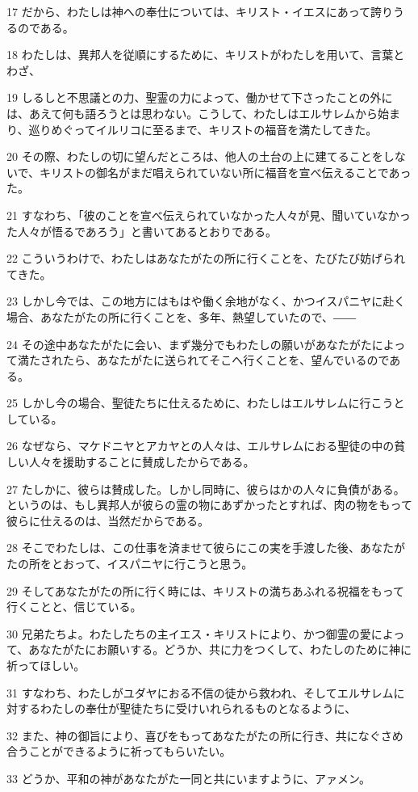 \par 17 だから、わたしは神への奉仕については、キリスト・イエスにあって誇りうるのである。
\par 18 わたしは、異邦人を従順にするために、キリストがわたしを用いて、言葉とわざ、
\par 19 しるしと不思議との力、聖霊の力によって、働かせて下さったことの外には、あえて何も語ろうとは思わない。こうして、わたしはエルサレムから始まり、巡りめぐってイルリコに至るまで、キリストの福音を満たしてきた。
\par 20 その際、わたしの切に望んだところは、他人の土台の上に建てることをしないで、キリストの御名がまだ唱えられていない所に福音を宣べ伝えることであった。
\par 21 すなわち、「彼のことを宣べ伝えられていなかった人々が見、聞いていなかった人々が悟るであろう」と書いてあるとおりである。
\par 22 こういうわけで、わたしはあなたがたの所に行くことを、たびたび妨げられてきた。
\par 23 しかし今では、この地方にはもはや働く余地がなく、かつイスパニヤに赴く場合、あなたがたの所に行くことを、多年、熱望していたので、――
\par 24 その途中あなたがたに会い、まず幾分でもわたしの願いがあなたがたによって満たされたら、あなたがたに送られてそこへ行くことを、望んでいるのである。
\par 25 しかし今の場合、聖徒たちに仕えるために、わたしはエルサレムに行こうとしている。
\par 26 なぜなら、マケドニヤとアカヤとの人々は、エルサレムにおる聖徒の中の貧しい人々を援助することに賛成したからである。
\par 27 たしかに、彼らは賛成した。しかし同時に、彼らはかの人々に負債がある。というのは、もし異邦人が彼らの霊の物にあずかったとすれば、肉の物をもって彼らに仕えるのは、当然だからである。
\par 28 そこでわたしは、この仕事を済ませて彼らにこの実を手渡した後、あなたがたの所をとおって、イスパニヤに行こうと思う。
\par 29 そしてあなたがたの所に行く時には、キリストの満ちあふれる祝福をもって行くことと、信じている。
\par 30 兄弟たちよ。わたしたちの主イエス・キリストにより、かつ御霊の愛によって、あなたがたにお願いする。どうか、共に力をつくして、わたしのために神に祈ってほしい。
\par 31 すなわち、わたしがユダヤにおる不信の徒から救われ、そしてエルサレムに対するわたしの奉仕が聖徒たちに受けいれられるものとなるように、
\par 32 また、神の御旨により、喜びをもってあなたがたの所に行き、共になぐさめ合うことができるように祈ってもらいたい。
\par 33 どうか、平和の神があなたがた一同と共にいますように、アァメン。

